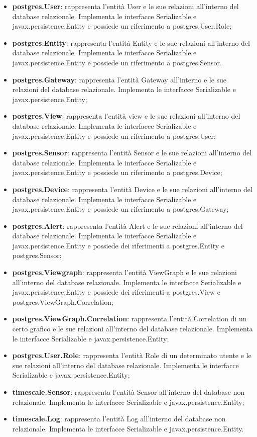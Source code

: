 		\begin{itemize}
		 	\item \textbf{postgres.User}: rappresenta l'entità User e le sue relazioni all'interno del database relazionale. Implementa le interfacce Serializable e javax.persistence.Entity e possiede un riferimento a postgres.User.Role;
		 	\item \textbf{postgres.Entity}: rappresenta l'entità Entity e le sue relazioni all'interno del database relazionale. Implementa le interfacce Serializable e javax.persistence.Entity e possiede un riferimento a postgres.Sensor.
		 	\item \textbf{postgres.Gateway}: rappresenta l'entità Gateway all'interno e le sue relazioni del database relazionale. Implementa le interfacce Serializable e javax.persistence.Entity;
		 	\item \textbf{postgres.View}: rappresenta l'entità view e le sue relazioni all'interno del database relazionale. Implementa le interfacce Serializable e javax.persistence.Entity e possiede un riferimento a postgres.User;
		 	\item \textbf{postgres.Sensor}: rappresenta l'entità Sensor e le sue relazioni all'interno del database relazionale. Implementa le interfacce Serializable e javax.persistence.Entity e possiede un riferimento a postgres.Device;
		 	\item \textbf{postgres.Device}: rappresenta l'entità Device e le sue relazioni all'interno del database relazionale. Implementa le interfacce Serializable e javax.persistence.Entity e possiede un riferimento a postgres.Gateway;
		 	\item \textbf{postgres.Alert}: rappresenta l'entità Alert e le sue relazioni all'interno del database relazionale. Implementa le interfacce Serializable e javax.persistence.Entity e possiede dei riferimenti a postgres.Entity e postgres.Sensor;
		 	\item \textbf{postgres.Viewgraph}: rappresenta l'entità ViewGraph e le sue relazioni all'interno del database relazionale. Implementa le interfacce Serializable e javax.persistence.Entity e possiede dei riferimenti a postgres.View e postgres.ViewGraph.Correlation;
		 	\item \textbf{postgres.ViewGraph.Correlation}: rappresenta l'entità Correlation di un certo grafico e le sue relazioni all'interno del database relazionale. Implementa le interfacce Serializable e javax.persistence.Entity;
		 	\item \textbf{postgres.User.Role}: rappresenta l'entità Role di un determinato utente e le sue relazioni all'interno del database relazionale. Implementa le interfacce Serializable e javax.persistence.Entity;
		 	\item \textbf{timescale.Sensor}: rappresenta l'entità Sensor all'interno del database non relazionale. Implementa le interfacce Serializable e javax.persistence.Entity;
		 	\item \textbf{timescale.Log}: rappresenta l'entità Log all'interno del database non relazionale. Implementa le interfacce Serializable e javax.persistence.Entity.
		 \end{itemize} 
